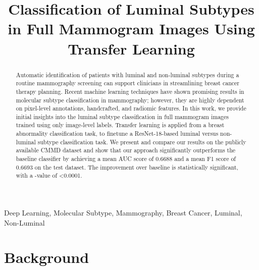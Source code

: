 \documentclass{article}
\title{Classification of Luminal Subtypes in Full Mammogram Images Using Transfer Learning}
\begin{document}
\ninept
\maketitle
\begin{abstract}
Automatic identification of patients with luminal and non-luminal subtypes during a routine mammography screening can support clinicians in streamlining breast cancer therapy planning. Recent machine learning techniques have shown promising results in molecular subtype classification in mammography; however, they are highly dependent on pixel-level annotations, handcrafted, and radiomic features. In this work, we provide initial insights into the luminal subtype classification in full mammogram images trained using only image-level labels. Transfer learning is applied from a breast abnormality classification task, to finetune a ResNet-18-based luminal versus non-luminal subtype classification task. We present and compare our results on the publicly available CMMD dataset and show that our approach significantly outperforms the baseline classifier by achieving a mean AUC score of 0.6688 and a mean F1 score of 0.6693 on the test dataset. The improvement over baseline is statistically significant, with a -value of \textless 0.0001. 

\end{abstract}
\begin{keywords}
Deep Learning, Molecular Subtype, Mammography, Breast Cancer, Luminal, Non-Luminal
\end{keywords}
\section{Background}
\label{sec:intro}
\end{document}
